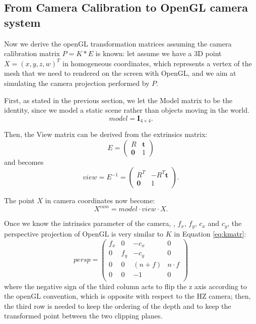 \subsection{From Camera Calibration to OpenGL camera system}
Now we derive the openGL transformation matrices assuming the camera calibration matrix $P = K * E$ is known: let assume we have a 3D point $X = (x,y,z,w)^T$ in homogeneous coordinates, which represents a vertex of the mesh that we need to rendered on the screen with OpenGL, and we aim at simulating the camera projection performed by $P$.

First, as stated in the previous section, we let the Model matrix to be the identity, since we model a static scene rather than objects moving in the world.
\begin{equation}
  model = \mathbf{I}_{4\times4}.
\end{equation}

Then, the View matrix can be derived from the extrinsics matrix:
\begin{equation}
  E =
\begin{pmatrix}
R & \mathbf{t}\\
\mathbf{0}&1
 \end{pmatrix} 
\end{equation}
and becomes
\begin{equation}
  view = E^{-1}=
\begin{pmatrix}
R^T & -R^T\mathbf{t}\\
\mathbf{0}&1
 \end{pmatrix}.
\end{equation}

The point $X$ in camera coordinates now become:
\begin{equation}
 X^{cam} = model \cdot view \cdot X.
\end{equation}



Once we know the intrinsics parameter of the camera, \ie,  $f_x$, $f_y$, $c_x$ and $c_y$, the perspective projection of OpenGL is very similar to $K$ in Equation \eqref{eq:kmatr}:
\begin{equation}
 persp =
 \begin{pmatrix}
  f_x & 0   & -c_x    & 0\\
  0   & f_y & -c_y    & 0\\
  0   & 0   & (n+f) & n\cdot f\\
  0   & 0   & -1      & 0\\
 \end{pmatrix}
\end{equation}
where the negative sign of the third column acts to flip the z axis according to the openGL convention, which is opposite with respect to the HZ camera; then, the third row is needed to keep the ordering of the depth and to keep the transformed point between the two clipping planes.

